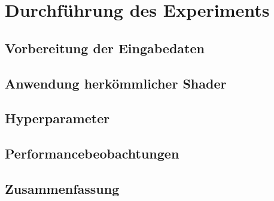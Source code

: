\chapter{Durchführung des Experiments}
\label{ch:conduct}

\section{Vorbereitung der Eingabedaten}
\label{sec:preparation}

\section{Anwendung herkömmlicher Shader}
\label{sec:shader}

\section{Hyperparameter}
\label{sec:hyperparams}

\section{Performancebeobachtungen}
\label{sec:performance}

\section{Zusammenfassung}
\label{sec:conclusion}
